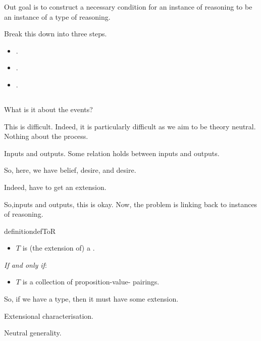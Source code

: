 
\begin{note}
  Out goal is to construct a necessary condition for an instance of reasoning to be an instance of a type of reasoning.
\end{note}

\begin{note}
  Break this down into three steps.

  \begin{itemize}
  \item
    \tor{}.
  \item
    \rotor{}.
  \item
    \tR{}.
  \end{itemize}
\end{note}


\subsection{}
\label{cha:typical:sec:tor:def}

\begin{note}
  What is it about the events?

  This is difficult.
  Indeed, it is particularly difficult as we aim to be theory neutral.
  Nothing about the process.

  Inputs and outputs.
  Some relation holds between inputs and outputs.

  So, here, we have belief, desire, and desire.

  Indeed, have to get an extension.

  So,inputs and outputs, this is okay.
  Now, the problem is linking back to instances of reasoning.
\end{note}

\begin{note}
  \begin{restatable}[\tor{2}]{definition}{defToR}
    \label{def:tor}
    \mbox{ }
    \vspace{-\baselineskip}
    \begin{itemize}
    \item
      \(T\) is (the extension of) a \emph{}.
    \end{itemize}

    \emph{If and only if}:

    \begin{itemize}
    \item
      \(T\) is a collection of proposition-value-\poP{} pairings.
    \end{itemize}
    \vspace{-\baselineskip}
  \end{restatable}

  So, if we have a type, then it must have some extension.

  Extensional characterisation.

  Neutral generality.
\end{note}

